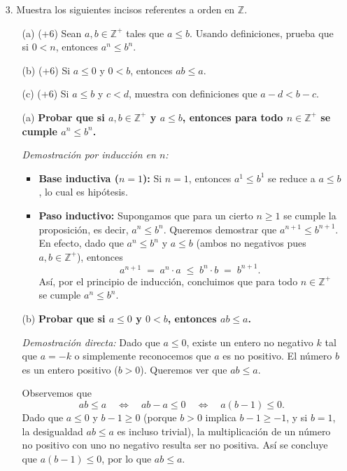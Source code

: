 \documentclass[12pt]{article}
\begin{document}
%
%
\begin{enumerate}
    \item[3.] Muestra los siguientes incisos referentes a orden en $\mathbb{Z}$.
      \begin{enumerate}
        \item[(a) (+6)] Sean $a,b \in \mathbb{Z}^+$ tales que $a \leq b$. Usando definiciones, prueba que si $0 < n$, entonces $a^n \leq b^n$.
        \item[(b) (+6)] Si $a \leq 0$ y $0 < b$, entonces $ab \leq a$.
        \item[(c) (+6)] Si $a \leq b$ y $c < d$, muestra con definiciones que $a - d < b - c$.
      \end{enumerate}
    
    
      \begin{enumerate}
    \item[(a)] \textbf{Probar que si $a, b \in \mathbb{Z}^+$ y $a \leq b$, entonces para todo $n \in \mathbb{Z}^+$ se cumple $a^n \leq b^n$.}
    
    \noindent
    \textit{Demostraci\'on por inducci\'on en $n$:}
    \begin{itemize}
    \item \textbf{Base inductiva ($n=1$):}  
    Si $n=1$, entonces $a^1 \leq b^1$ se reduce a $a \leq b$, lo cual es hip\'otesis.
    
    \item \textbf{Paso inductivo:}  
    Supongamos que para un cierto $n \ge 1$ se cumple la proposici\'on, es decir, $a^n \leq b^n$.  
    Queremos demostrar que $a^{n+1} \leq b^{n+1}$.  
    En efecto, dado que $a^n \leq b^n$ y $a \leq b$ (ambos no negativos pues $a,b \in \mathbb{Z}^+$), entonces 
    \[
    a^{n+1} \;=\; a^n \cdot a \;\le\; b^n \cdot b \;=\; b^{n+1}.
    \]
    As\'i, por el principio de inducci\'on, concluimos que para todo $n \in \mathbb{Z}^+$ se cumple $a^n \leq b^n$.
    \end{itemize}
    
    \item[(b)] \textbf{Probar que si $a \leq 0$ y $0 < b$, entonces $ab \leq a$.}
    
    \noindent
    \textit{Demostraci\'on directa:}  
    Dado que $a \leq 0$, existe un entero no negativo $k$ tal que $a = -k$ o simplemente reconocemos que $a$ es no positivo. El n\'umero $b$ es un entero positivo ($b > 0$). Queremos ver que $ab \leq a$.  
    
    Observemos que
    \[
    ab \leq a \quad \Longleftrightarrow \quad ab - a \leq 0 \quad \Longleftrightarrow \quad a(b - 1) \leq 0.
    \]
    Dado que $a \leq 0$ y $b - 1 \geq 0$ (porque $b > 0$ implica $b - 1 \ge -1$, y si $b=1$, la desigualdad $ab \le a$ es incluso trivial), la multiplicaci\'on de un n\'umero no positivo con uno no negativo resulta ser no positiva. As\'i se concluye que $a(b-1) \leq 0$, por lo que $ab \leq a$.
    

\end{enumerate}
\end{enumerate}
\end{document}
